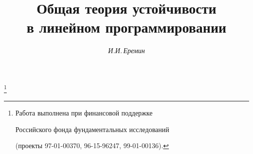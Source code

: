 




% 


\newcommand{\opt}{\operatorname{opt}}


\newcommand{\rang}{\operatorname{rang}}


\newcommand{\sign}{\operatorname{sign}}


\newcommand{\Arg}{\operatorname{Arg}}


\newcommand{\tts}[1]{}


\renewcommand{\baselinestretch}{1.05}







\setcounter{page}{43}















\author{\it И.И.\,Еремин}




\title{Общая теория устойчивости\\


в линейном программировании}


\thanks{Работа выполнена при финансовой поддержке


Российского фонда фундаментальных исследований


(проекты 97-01-00370, 96-15-96247, 99-01-00136).}





\date{}







